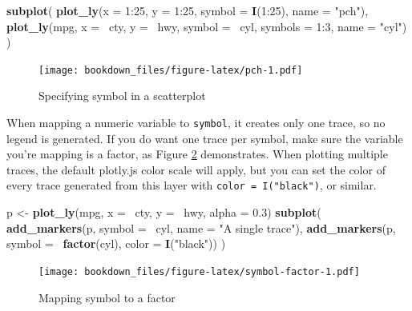 \documentclass[12pt,]{isuthesis}
\newenvironment{Shaded}{\begin{snugshade}}{\end{snugshade}}
\newcommand{\KeywordTok}[1]{\textcolor[rgb]{0.13,0.29,0.53}{\textbf{{#1}}}}
\newcommand{\DataTypeTok}[1]{\textcolor[rgb]{0.13,0.29,0.53}{{#1}}}
\newcommand{\DecValTok}[1]{\textcolor[rgb]{0.00,0.00,0.81}{{#1}}}
\newcommand{\FloatTok}[1]{\textcolor[rgb]{0.00,0.00,0.81}{{#1}}}
\newcommand{\StringTok}[1]{\textcolor[rgb]{0.31,0.60,0.02}{{#1}}}
\newcommand{\NormalTok}[1]{{#1}}
\begin{document}
\begin{Shaded}
\begin{Highlighting}[]
\KeywordTok{subplot}\NormalTok{(}
  \KeywordTok{plot_ly}\NormalTok{(}\DataTypeTok{x =} \DecValTok{1}\NormalTok{:}\DecValTok{25}\NormalTok{, }\DataTypeTok{y =} \DecValTok{1}\NormalTok{:}\DecValTok{25}\NormalTok{, }\DataTypeTok{symbol =} \KeywordTok{I}\NormalTok{(}\DecValTok{1}\NormalTok{:}\DecValTok{25}\NormalTok{), }\DataTypeTok{name =} \StringTok{"pch"}\NormalTok{),}
  \KeywordTok{plot_ly}\NormalTok{(mpg, }\DataTypeTok{x =} \NormalTok{~cty, }\DataTypeTok{y =} \NormalTok{~hwy, }\DataTypeTok{symbol =} \NormalTok{~cyl, }\DataTypeTok{symbols =} \DecValTok{1}\NormalTok{:}\DecValTok{3}\NormalTok{, }\DataTypeTok{name =} \StringTok{"cyl"}\NormalTok{)}
\NormalTok{)}
\end{Highlighting}
\end{Shaded}

\begin{figure}[htbp]
\centering
\texttt{[image: bookdown\_files/figure-latex/pch-1.pdf]}
\caption{\label{fig:pch}Specifying symbol in a scatterplot}
\end{figure}

When mapping a numeric variable to \texttt{symbol}, it creates only one
trace, so no legend is generated. If you do want one trace per symbol,
make sure the variable you're mapping is a factor, as Figure
\ref{fig:symbol-factor} demonstrates. When plotting multiple traces, the
default plotly.js color scale will apply, but you can set the color of
every trace generated from this layer with
\texttt{color\ =\ I("black")}, or similar.

\begin{Shaded}
\begin{Highlighting}[]
\NormalTok{p <-}\StringTok{ }\KeywordTok{plot_ly}\NormalTok{(mpg, }\DataTypeTok{x =} \NormalTok{~cty, }\DataTypeTok{y =} \NormalTok{~hwy, }\DataTypeTok{alpha =} \FloatTok{0.3}\NormalTok{) }
\KeywordTok{subplot}\NormalTok{(}
  \KeywordTok{add_markers}\NormalTok{(p, }\DataTypeTok{symbol =} \NormalTok{~cyl, }\DataTypeTok{name =} \StringTok{"A single trace"}\NormalTok{),}
  \KeywordTok{add_markers}\NormalTok{(p, }\DataTypeTok{symbol =} \NormalTok{~}\KeywordTok{factor}\NormalTok{(cyl), }\DataTypeTok{color =} \KeywordTok{I}\NormalTok{(}\StringTok{"black"}\NormalTok{))}
\NormalTok{)}
\end{Highlighting}
\end{Shaded}

\begin{figure}[htbp]
\centering
\texttt{[image: bookdown\_files/figure-latex/symbol-factor-1.pdf]}
\caption{\label{fig:symbol-factor}Mapping symbol to a factor}
\end{figure}
\end{document}
